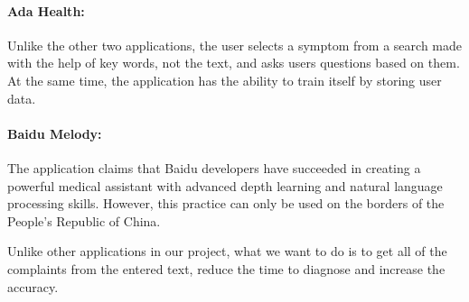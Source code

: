 \paragraph{Ada	Health:}Unlike	the	other	two	applications,	the	user	selects	a	symptom	from	a	search	made	with	the	help	of	key	words,	not	the	text,	and	asks	users	questions	based	on	them.	At	the	same	time,	the	application	has	the	ability	to	train	itself	by	storing	user	data.	

\paragraph{Baidu	Melody:}The application	claims	that	Baidu	developers	have	succeeded	in	creating	a	powerful	medical	assistant	with	advanced	depth	learning	and	natural	language	processing	skills.	However,	this	practice	can	only	be	used	on	the	borders	of	the	People's	Republic	of	China.	

Unlike	other	applications	in	our	project,	what	we	want	to	do	is	to	get	all	of	the	complaints	from	the	entered	text,	reduce	the	time	to	diagnose	and	increase	the	accuracy.			
